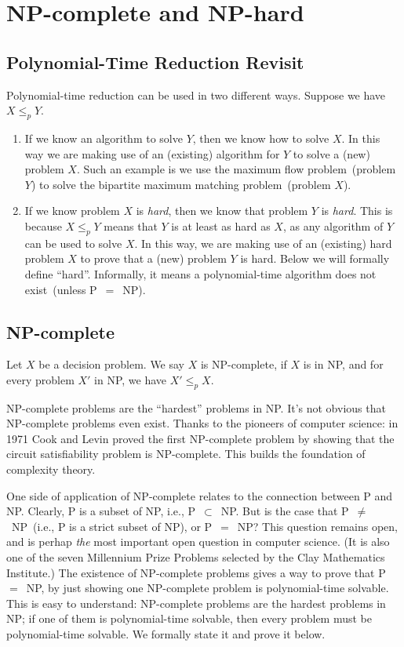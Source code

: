 \section{NP-complete and NP-hard}

\subsection*{Polynomial-Time Reduction Revisit}

Polynomial-time reduction can be used in two different ways. Suppose we have $X\le_p Y$.
\vspace*{-\topsep}
\begin{enumerate}
\item If we know an algorithm to solve $Y$, then we know how to solve $X$. In this way
we are making use of an (existing) algorithm for $Y$ to solve a (new) problem $X$. Such an example
is we use the maximum flow problem~(problem $Y$) to solve the bipartite maximum matching problem~(problem $X$).
\item If we know problem $X$ is \emph{hard}, then we know that problem $Y$ is \emph{hard}. 
This is because $X\le_p Y$ means that $Y$ is at least as hard as $X$, as any algorithm of $Y$ can be used to solve $X$.
In this way, we are making use of an (existing) hard problem $X$
to prove that a (new) problem $Y$ is hard.  Below we will formally define ``hard''.
Informally, it means a polynomial-time algorithm does not exist~(unless P{}~$=${}~NP).
\end{enumerate}


\subsection*{NP-complete}

\begin{definition}[NP-complete]
Let $X$ be a decision problem. We say $X$ is NP-complete, if $X$ is in NP, and for every problem $X'$ in NP, we have $X'\le_p X$.
\end{definition}

NP-complete problems are the ``hardest'' problems in NP. It's not obvious that
NP-complete problems even exist.  
Thanks to the pioneers of computer science: in 1971 Cook and Levin proved the first
NP-complete problem by showing that the circuit satisfiability problem is NP-complete.
This builds the foundation of complexity theory.

One side of application of NP-complete relates to the connection between P and NP.
Clearly, P is a subset of NP, i.e., P{}~$\subset${}~NP.
But is the case that P{}~$\neq${}~NP~(i.e., P is a strict subset of NP),
or P{}~$=${}~NP?  This question remains open,
and is perhap \emph{the} most important open question in computer science.
(It is also one of the seven Millennium Prize Problems selected by the Clay Mathematics Institute.)
The existence of NP-complete problems gives a way to prove that P{}~$=${}~NP, by just showing
one NP-complete problem is polynomial-time solvable. This is easy to understand: NP-complete
problems are the hardest problems in NP; if one of them is polynomial-time solvable,
then every problem must be polynomial-time solvable. We formally state it and prove it below.

